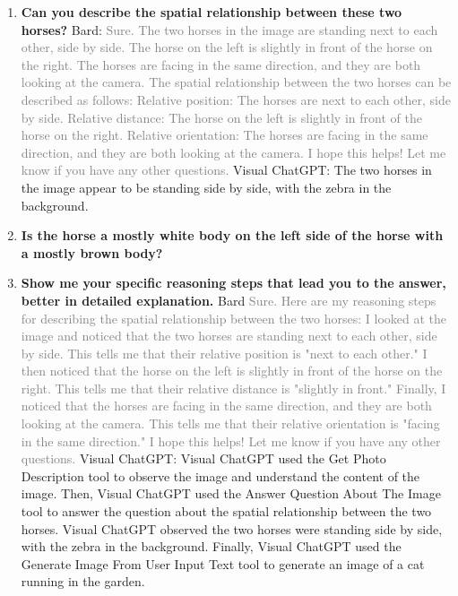     \begin{enumerate}
        \item \textbf{Can you describe the spatial relationship between these two horses?}
        \subitem Bard: \textcolor{gray}{
            Sure. The two horses in the image are standing next to each other, side by side. The horse on the left is slightly in front of the horse on the right. The horses are facing in the same direction, and they are both looking at the camera. The spatial relationship between the two horses can be described as follows:
            Relative position: The horses are next to each other, side by side.
            Relative distance: The horse on the left is slightly in front of the horse on the right.
            Relative orientation: The horses are facing in the same direction, and they are both looking at the camera.
            I hope this helps! Let me know if you have any other questions.}
            \subitem Visual ChatGPT: The two horses in the image appear to be standing side by side, with the zebra in the background.
        \item \textbf{Is the horse a mostly white body on the left side of the horse with a mostly brown body?}
        \item \textbf{Show me your specific reasoning steps that lead you to the answer, better in detailed explanation.}
        \subitem Bard \textcolor{gray}{
            Sure. Here are my reasoning steps for describing the spatial relationship between the two horses:
            I looked at the image and noticed that the two horses are standing next to each other, side by side. This tells me that their relative position is "next to each other."
            I then noticed that the horse on the left is slightly in front of the horse on the right. This tells me that their relative distance is "slightly in front."
            Finally, I noticed that the horses are facing in the same direction, and they are both looking at the camera. This tells me that their relative orientation is "facing in the same direction."
            I hope this helps! Let me know if you have any other questions.}
        \subitem Visual ChatGPT: Visual ChatGPT used the Get Photo Description tool to observe the image and understand the content of the image. Then, Visual ChatGPT used the Answer Question About The Image tool to answer the question about the spatial relationship between the two horses. Visual ChatGPT observed the two horses were standing side by side, with the zebra in the background. Finally, Visual ChatGPT used the Generate Image From User Input Text tool to generate an image of a cat running in the garden.
    \end{enumerate}
